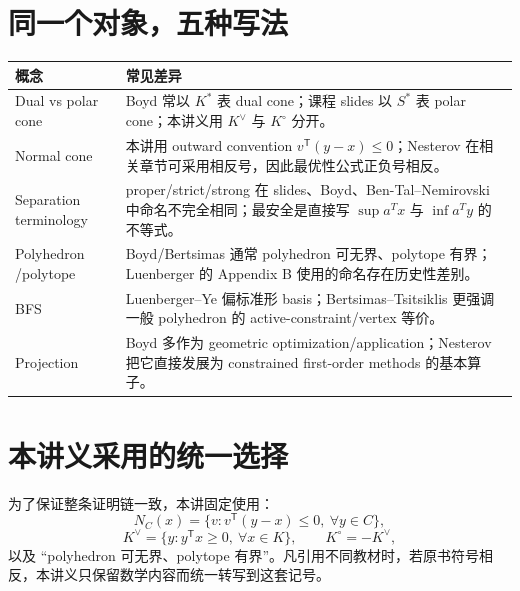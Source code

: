 \documentclass[11pt,a4paper,openany]{ctexrep}
\theoremstyle{definition}
\newcommand{\transpose}{\mathsf{T}}
\begin{document}
\section{同一个对象，五种写法}
\begin{center}
\small
\begin{tabularx}{\textwidth}{p{} X}
\toprule
\textbf{概念} & \textbf{常见差异}\\
\midrule
Dual vs polar cone & Boyd 常以 $K^*$ 表 dual cone；课程 slides 以 $S^*$ 表 polar cone；本讲义用 $K^\vee$ 与 $K^\circ$ 分开。\\
Normal cone & 本讲用 outward convention $v^\transpose(y-x)\le0$；Nesterov 在相关章节可采用相反号，因此最优性公式正负号相反。\\
Separation terminology & proper/strict/strong 在 slides、Boyd、Ben-Tal--Nemirovski 中命名不完全相同；最安全是直接写 $\sup a^Tx$ 与 $\inf a^Ty$ 的不等式。\\
Polyhedron /\allowbreak polytope & Boyd/Bertsimas 通常 polyhedron 可无界、polytope 有界；Luenberger 的 Appendix B 使用的命名存在历史性差别。\\
BFS & Luenberger--Ye 偏标准形 basis；Bertsimas--Tsitsiklis 更强调一般 polyhedron 的 active-constraint/vertex 等价。\\
Projection & Boyd 多作为 geometric optimization/application；Nesterov 把它直接发展为 constrained first-order methods 的基本算子。\\
\bottomrule
\end{tabularx}
\end{center}

\section{本讲义采用的统一选择}
为了保证整条证明链一致，本讲固定使用：
\[
N_C(x)=\{v:v^\transpose(y-x)\le0,\ \forall y\in C\},
\]
\[
K^\vee=\{y:y^\transpose x\ge0,\ \forall x\in K\},\qquad
K^\circ=-K^\vee,
\]
以及 ``polyhedron 可无界、polytope 有界''。凡引用不同教材时，若原书符号相反，本讲义只保留数学内容而统一转写到这套记号。
\end{document}
